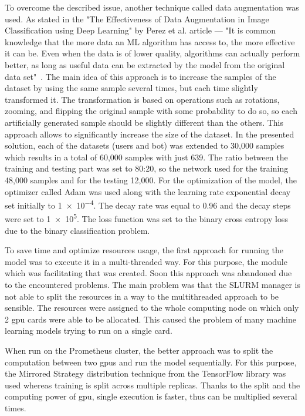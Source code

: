 To overcome the described issue, another technique called data augmentation was used.
As stated in the "The Effectiveness of Data Augmentation in Image Classification using Deep Learning" by Perez et al. article --- "It is common knowledge that the more data an ML algorithm has access to, the more effective it can be.
Even when the data is of lower quality, algorithms can actually perform better, as long as useful data can be extracted by the model from the original data set"~\cite{augmentation}.
The main idea of this approach is to increase the samples of the dataset by using the same sample several times, but each time slightly transformed it.
The transformation is based on operations such as rotations, zooming, and flipping the original sample with some probability to do so, so each artificially generated sample should be slightly different than the others.
This approach allows to significantly increase the size of the dataset.
In the presented solution, each of the datasets (users and bot) was extended to 30,000 samples which results in a total of 60,000 samples with just 639.
The ratio between the training and testing part was set to 80:20, so the network used for the training 48,000 samples and for the testing 12,000.
For the optimization of the model, the optimizer called Adam was used along with the learning rate exponential decay set initially to \num{1e-4}.
The decay rate was equal to 0.96 and the decay steps were set to \num{1e5}.
The loss function was set to the binary cross entropy loss due to the binary classification problem.

To save time and optimize resources usage, the first approach for running the model was to execute it in a multi-threaded way.
For this purpose, the module which was facilitating that was created.
Soon this approach was abandoned due to the encountered problems.
The main problem was that the SLURM manager is not able to split the resources in a way to the multithreaded approach to be sensible.
The resources were assigned to the whole computing node on which only 2 \gls{gpu} cards were able to be allocated.
This caused the problem of many machine learning models trying to run on a single card.

When run on the Prometheus cluster, the better approach was to split the computation between two \gls{gpu}s and run the model sequentially.
For this purpose, the Mirrored Strategy distribution technique from the TensorFlow library was used whereas training is split across multiple replicas.
Thanks to the split and the computing power of \gls{gpu}, single execution is faster, thus can be multiplied several times.